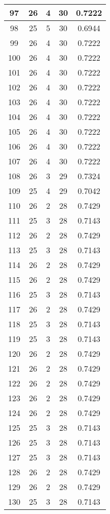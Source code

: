 \documentclass[letterpaper, 12pt]{article}
\begin{document}
\begin{longtable}{|c|c|c|c|c|}
\hline
97 & 26 & 4 & 30 & 0.7222 \\
\hline
98 & 25 & 5 & 30 & 0.6944 \\
\hline
99 & 26 & 4 & 30 & 0.7222 \\
\hline
100 & 26 & 4 & 30 & 0.7222 \\
\hline
101 & 26 & 4 & 30 & 0.7222 \\
\hline
102 & 26 & 4 & 30 & 0.7222 \\
\hline
103 & 26 & 4 & 30 & 0.7222 \\
\hline
104 & 26 & 4 & 30 & 0.7222 \\
\hline
105 & 26 & 4 & 30 & 0.7222 \\
\hline
106 & 26 & 4 & 30 & 0.7222 \\
\hline
107 & 26 & 4 & 30 & 0.7222 \\
\hline
108 & 26 & 3 & 29 & 0.7324 \\
\hline
109 & 25 & 4 & 29 & 0.7042 \\
\hline
110 & 26 & 2 & 28 & 0.7429 \\
\hline
111 & 25 & 3 & 28 & 0.7143 \\
\hline
112 & 26 & 2 & 28 & 0.7429 \\
\hline
113 & 25 & 3 & 28 & 0.7143 \\
\hline
114 & 26 & 2 & 28 & 0.7429 \\
\hline
115 & 26 & 2 & 28 & 0.7429 \\
\hline
116 & 25 & 3 & 28 & 0.7143 \\
\hline
117 & 26 & 2 & 28 & 0.7429 \\
\hline
118 & 25 & 3 & 28 & 0.7143 \\
\hline
119 & 25 & 3 & 28 & 0.7143 \\
\hline
120 & 26 & 2 & 28 & 0.7429 \\
\hline
121 & 26 & 2 & 28 & 0.7429 \\
\hline
122 & 26 & 2 & 28 & 0.7429 \\
\hline
123 & 26 & 2 & 28 & 0.7429 \\
\hline
124 & 26 & 2 & 28 & 0.7429 \\
\hline
125 & 25 & 3 & 28 & 0.7143 \\
\hline
126 & 25 & 3 & 28 & 0.7143 \\
\hline
127 & 25 & 3 & 28 & 0.7143 \\
\hline
128 & 26 & 2 & 28 & 0.7429 \\
\hline
129 & 26 & 2 & 28 & 0.7429 \\
\hline
130 & 25 & 3 & 28 & 0.7143 \\

\end{longtable}
\end{document}
